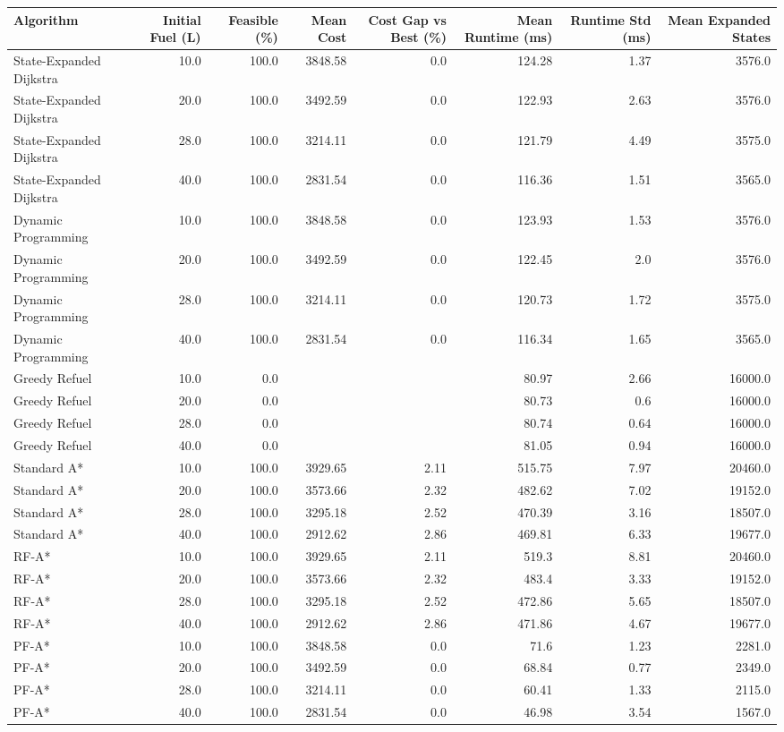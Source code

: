 \begin{tabular}{lrrrrrrr}
\hline
Algorithm & Initial Fuel (L) & Feasible (\%) & Mean Cost & Cost Gap vs Best (\%) & Mean Runtime (ms) & Runtime Std (ms) & Mean Expanded States \\
\hline
State-Expanded Dijkstra & 10.0 & 100.0 & 3848.58 & 0.0 & 124.28 & 1.37 & 3576.0 \\
State-Expanded Dijkstra & 20.0 & 100.0 & 3492.59 & 0.0 & 122.93 & 2.63 & 3576.0 \\
State-Expanded Dijkstra & 28.0 & 100.0 & 3214.11 & 0.0 & 121.79 & 4.49 & 3575.0 \\
State-Expanded Dijkstra & 40.0 & 100.0 & 2831.54 & 0.0 & 116.36 & 1.51 & 3565.0 \\
Dynamic Programming & 10.0 & 100.0 & 3848.58 & 0.0 & 123.93 & 1.53 & 3576.0 \\
Dynamic Programming & 20.0 & 100.0 & 3492.59 & 0.0 & 122.45 & 2.0 & 3576.0 \\
Dynamic Programming & 28.0 & 100.0 & 3214.11 & 0.0 & 120.73 & 1.72 & 3575.0 \\
Dynamic Programming & 40.0 & 100.0 & 2831.54 & 0.0 & 116.34 & 1.65 & 3565.0 \\
Greedy Refuel & 10.0 & 0.0 &  &  & 80.97 & 2.66 & 16000.0 \\
Greedy Refuel & 20.0 & 0.0 &  &  & 80.73 & 0.6 & 16000.0 \\
Greedy Refuel & 28.0 & 0.0 &  &  & 80.74 & 0.64 & 16000.0 \\
Greedy Refuel & 40.0 & 0.0 &  &  & 81.05 & 0.94 & 16000.0 \\
Standard A* & 10.0 & 100.0 & 3929.65 & 2.11 & 515.75 & 7.97 & 20460.0 \\
Standard A* & 20.0 & 100.0 & 3573.66 & 2.32 & 482.62 & 7.02 & 19152.0 \\
Standard A* & 28.0 & 100.0 & 3295.18 & 2.52 & 470.39 & 3.16 & 18507.0 \\
Standard A* & 40.0 & 100.0 & 2912.62 & 2.86 & 469.81 & 6.33 & 19677.0 \\
RF-A* & 10.0 & 100.0 & 3929.65 & 2.11 & 519.3 & 8.81 & 20460.0 \\
RF-A* & 20.0 & 100.0 & 3573.66 & 2.32 & 483.4 & 3.33 & 19152.0 \\
RF-A* & 28.0 & 100.0 & 3295.18 & 2.52 & 472.86 & 5.65 & 18507.0 \\
RF-A* & 40.0 & 100.0 & 2912.62 & 2.86 & 471.86 & 4.67 & 19677.0 \\
PF-A* & 10.0 & 100.0 & 3848.58 & 0.0 & 71.6 & 1.23 & 2281.0 \\
PF-A* & 20.0 & 100.0 & 3492.59 & 0.0 & 68.84 & 0.77 & 2349.0 \\
PF-A* & 28.0 & 100.0 & 3214.11 & 0.0 & 60.41 & 1.33 & 2115.0 \\
PF-A* & 40.0 & 100.0 & 2831.54 & 0.0 & 46.98 & 3.54 & 1567.0 \\
\hline
\end{tabular}
